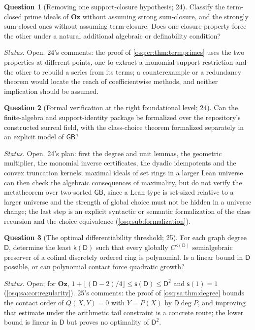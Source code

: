 \documentclass[11pt,letterpaper]{article}
\numberwithin{equation}{section}
\theoremstyle{definition}
\newtheorem{question}[question]{Question}
\theoremstyle{remark}
\theoremstyle{plain}
\newcommand{\Oz}{\mathbf{Oz}}
\begin{document}
\begin{question}[Removing one support-closure hypothesis; 24]\label{osq:cr:q:support}
Classify the term-closed prime ideals of $\Oz$ without assuming strong sum-closure, and the strongly sum-closed ones without assuming term-closure. Does
one closure property force the other under a natural additional algebraic or definability condition?
\end{question}
\emph{Status.} Open. 24's comments: the proof of \cref{osq:cr:thm:termprimes} uses the two properties at different points, one to extract a monomial
support restriction and the other to rebuild a series from its terms; a counterexample or a redundancy theorem would locate the reach of coefficientwise
methods, and neither implication should be assumed.

\begin{question}[Formal verification at the right foundational level; 24]\label{osq:cr:q:formal}
Can the finite-algebra and support-identity package be formalized over the repository's constructed surreal field, with the class-choice theorem
formalized separately in an explicit model of $\mathsf{GB}$?
\end{question}
\emph{Status.} Open. 24's plan: first the degree and unit lemmas, the geometric multiplier, the monomial inverse certificates, the dyadic idempotents and
the convex truncation kernels; maximal ideals of set rings in a larger Lean universe can then check the algebraic consequences of maximality, but do not
verify the metatheorem over two-sorted $\mathsf{GB}$, since a Lean type is set-sized relative to a larger universe and the strength of global choice must
not be hidden in a universe change; the last step is an explicit syntactic or semantic formalization of the class recursion and the choice equivalence
(\cref{osq:sub:formalization}).

\begin{question}[The optimal differentiability threshold; 25]\label{osq:sa:q:optimal}
For each graph degree $\mathsf D$, determine the least $\mathsf k(\mathsf D)$ such that every globally $C^{\mathsf k(\mathsf D)}$ semialgebraic preserver of a
cofinal discretely ordered ring is polynomial. Is a linear bound in $\mathsf D$ possible, or can polynomial contact force quadratic growth?
\end{question}
\emph{Status.} Open; for $\Oz$, $1+\lfloor(\mathsf D-2)/4\rfloor\le\mathsf s(\mathsf D)\le\mathsf D^2$ and $\mathsf s(1)=1$ (\cref{osq:sa:cor:regularity}).
25's comments: the proof of \cref{osq:sa:thm:degree} bounds the contact order of $Q(X,Y)=0$ with $Y=P(X)$ by $\mathsf D\deg P$, and improving that estimate
under the arithmetic tail constraint is a concrete route; the lower bound is linear in $\mathsf D$ but proves no optimality of $\mathsf D^2$.
\end{document}
